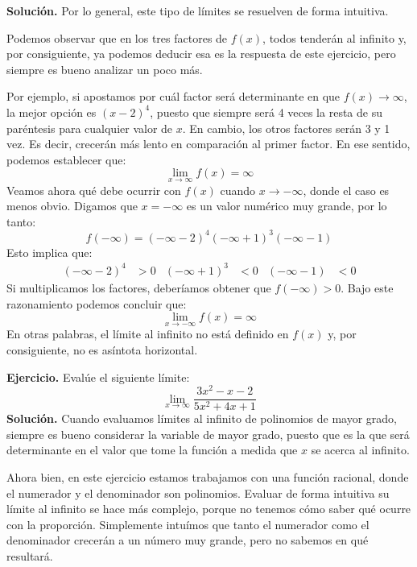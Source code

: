 \documentclass[12pt]{article}
\begin{document}
\textbf{Solución.} \quad Por lo general, este tipo de límites se resuelven de forma intuitiva.

Podemos observar que en los tres factores de $f(x)$, todos tenderán al infinito y, por consiguiente, ya podemos deducir esa es la respuesta de este ejercicio, pero siempre es bueno analizar un poco más.

Por ejemplo, si apostamos por cuál factor será determinante en que $f(x) \to \infty$, la mejor opción es $(x - 2)^{4}$, puesto que siempre será 4 veces la resta de su paréntesis para cualquier valor de $x$. En cambio, los otros factores serán 3 y 1 vez. Es decir, crecerán más lento en comparación al primer factor. En ese sentido, podemos establecer que:
\[\lim_{x \to \infty} f(x) = \infty\]
Veamos ahora qué debe ocurrir con $f(x)$ cuando $x \to -\infty$, donde el caso es menos obvio. Digamos que $x = -\infty$ es un valor numérico muy grande, por lo tanto:
\[f(-\infty) = (-\infty - 2)^{4}(-\infty + 1)^{3}(-\infty - 1)\]
Esto implica que:
\begin{align*}
(-\infty - 2)^{4} &> 0 &
(-\infty + 1)^{3} &< 0 &
(-\infty - 1) &< 0
\end{align*}
Si multiplicamos los factores, deberíamos obtener que $f(-\infty) > 0$. Bajo este razonamiento podemos concluir que:
\[\lim_{x \to -\infty} f(x) = \infty\]
En otras palabras, el límite al infinito no está definido en $f(x)$ y, por consiguiente, no es asíntota horizontal.

\newpage

\textbf{Ejercicio.} \quad Evalúe el siguiente límite:
\[
	\lim_{x \to \infty} \frac{3x^{2} - x - 2}{5x^{2} + 4x + 1}
\]
\textbf{Solución.} \quad Cuando evaluamos límites al infinito de polinomios de mayor grado, siempre es bueno considerar la variable de mayor grado, puesto que es la que será determinante en el valor que tome la función a medida que $x$ se acerca al infinito.

Ahora bien, en este ejercicio estamos trabajamos con una función racional, donde el numerador y el denominador son polinomios. Evaluar de forma intuitiva su límite al infinito se hace más complejo, porque no tenemos cómo saber qué ocurre con la proporción. Simplemente intuímos que tanto el numerador como el denominador crecerán a un número muy grande, pero no sabemos en qué resultará.
\end{document}
